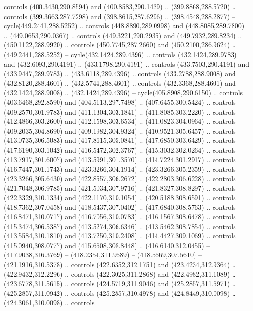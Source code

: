\begin{scope}[cm={{1.25,0.0,0.0,-1.25,(0.0,743.43331)}}]
    controls (400.3430,290.8594) and (400.8583,290.1439) .. (399.8868,288.5720) ..
    controls (399.3663,287.7298) and (398.8615,287.6296) .. (398.4548,288.2877) --
    cycle(449.2441,288.5252) .. controls (448.8890,289.0998) and
    (448.8085,289.7800) .. (449.0653,290.0367) .. controls (449.3221,290.2935) and
    (449.7932,289.8234) .. (450.1122,288.9920) .. controls (450.7745,287.2660) and
    (450.2100,286.9624) .. (449.2441,288.5252) -- cycle(432.1424,289.4396) ..
    controls (432.1424,289.9783) and (432.6093,290.4191) .. (433.1798,290.4191) ..
    controls (433.7503,290.4191) and (433.9447,289.9783) .. (433.6118,289.4396) ..
    controls (433.2788,288.9008) and (432.8120,288.4601) .. (432.5744,288.4601) ..
    controls (432.3368,288.4601) and (432.1424,288.9008) .. (432.1424,289.4396) --
    cycle(405.8908,290.6150) .. controls (403.6468,292.8590) and
    (404.5113,297.7498) .. (407.6455,300.5424) .. controls (409.2570,301.9783) and
    (411.1304,303.1841) .. (411.8085,303.2220) .. controls (412.4866,303.2600) and
    (412.1598,303.6534) .. (411.0823,304.0964) .. controls (409.2035,304.8690) and
    (409.1982,304.9324) .. (410.9521,305.6457) .. controls (413.0735,306.5083) and
    (417.8615,305.0841) .. (417.6850,303.6429) .. controls (417.6190,303.1042) and
    (416.5472,302.3767) .. (415.3032,302.0264) .. controls (413.7917,301.6007) and
    (413.5991,301.3570) .. (414.7224,301.2917) .. controls (416.7447,301.1743) and
    (423.3266,304.1914) .. (423.3266,305.2359) .. controls (423.3266,305.6430) and
    (422.8557,306.2672) .. (422.2803,306.6228) .. controls (421.7048,306.9785) and
    (421.5034,307.9716) .. (421.8327,308.8297) .. controls (422.3329,310.1334) and
    (422.1170,310.1054) .. (420.5188,308.6591) .. controls (418.7362,307.0458) and
    (418.5437,307.0402) .. (417.6840,308.5763) .. controls (416.8471,310.0717) and
    (416.7056,310.0783) .. (416.1567,308.6478) .. controls (415.3474,306.5387) and
    (413.5274,306.6346) .. (413.5462,308.7854) .. controls (413.5584,310.1810) and
    (413.7250,310.2408) .. (414.4427,309.1069) .. controls (415.0940,308.0777) and
    (415.6608,308.8448) .. (416.6140,312.0455) -- (417.9038,316.3769) --
    (418.2354,311.9689) -- (418.5669,307.5610) -- (421.1916,310.5378) .. controls
    (422.6352,312.1751) and (423.4234,312.9364) .. (422.9432,312.2296) .. controls
    (422.3025,311.2868) and (422.4982,311.1089) .. (423.6778,311.5615) .. controls
    (424.5719,311.9046) and (425.2857,311.6971) .. (425.2857,311.0942) .. controls
    (425.2857,310.4978) and (424.8449,310.0098) .. (424.3061,310.0098) .. controls

\end{scope}
